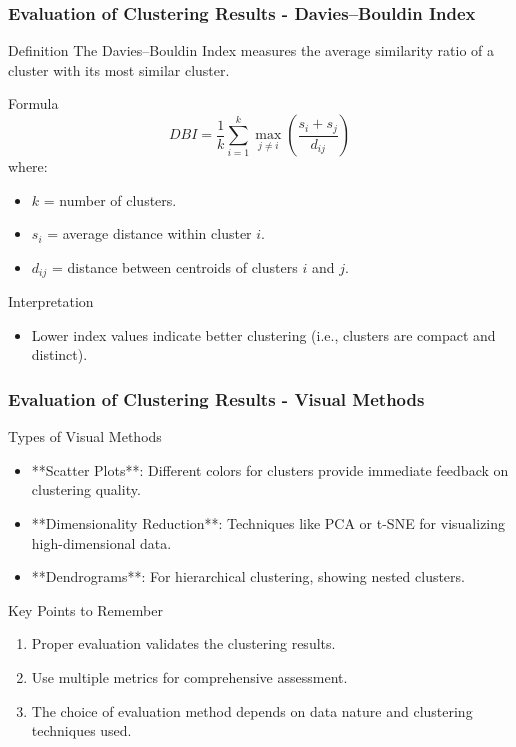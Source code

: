 \documentclass[aspectratio=169]{beamer}
\begin{document}
\begin{frame}[fragile]
    \frametitle{Evaluation of Clustering Results - Davies–Bouldin Index}
    \begin{block}{Definition}
        The Davies–Bouldin Index measures the average similarity ratio of a cluster with its most similar cluster.
    \end{block}
    \begin{block}{Formula}
        \begin{equation}
        DBI = \frac{1}{k} \sum_{i=1}^{k} \max_{j \neq i} \left( \frac{s_i + s_j}{d_{ij}} \right)
        \end{equation}
        where:
        \begin{itemize}
            \item \( k \) = number of clusters.
            \item \( s_i \) = average distance within cluster \( i \).
            \item \( d_{ij} \) = distance between centroids of clusters \( i \) and \( j \).
        \end{itemize}
    \end{block}
    \begin{block}{Interpretation}
        \begin{itemize}
            \item Lower index values indicate better clustering (i.e., clusters are compact and distinct).
        \end{itemize}
    \end{block}
\end{frame}

\begin{frame}[fragile]
    \frametitle{Evaluation of Clustering Results - Visual Methods}
    \begin{block}{Types of Visual Methods}
        \begin{itemize}
            \item **Scatter Plots**: Different colors for clusters provide immediate feedback on clustering quality.
            \item **Dimensionality Reduction**: Techniques like PCA or t-SNE for visualizing high-dimensional data.
            \item **Dendrograms**: For hierarchical clustering, showing nested clusters.
        \end{itemize}
    \end{block}
    \begin{block}{Key Points to Remember}
        \begin{enumerate}
            \item Proper evaluation validates the clustering results.
            \item Use multiple metrics for comprehensive assessment.
            \item The choice of evaluation method depends on data nature and clustering techniques used.
        \end{enumerate}
    \end{block}
\end{frame}
\end{document}
